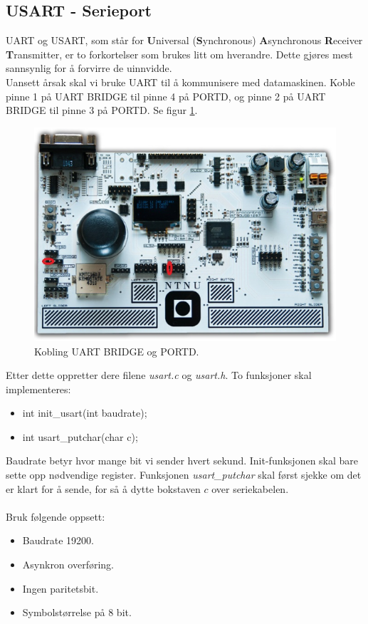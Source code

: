 \documentclass[11pt,a4paper]{article}
\begin{document}
\subsection{USART - Serieport}
\label{TASK::USART}
UART og USART, som står for \textbf{U}niversal (\textbf{S}ynchronous) \textbf{A}synchronous \textbf{R}eceiver \textbf{T}ransmitter, er to forkortelser som brukes litt om hverandre. Dette gjøres mest sannsynlig for å forvirre de uinnvidde.\\
Uansett årsak skal vi bruke UART til å kommunisere med datamaskinen. Koble pinne 1 på UART BRIDGE til pinne 4 på PORTD, og pinne 2 på UART BRIDGE til pinne 3 på PORTD. Se figur \ref{UART::PORTD}.
\begin{figure}[hb]
\centering
\includegraphics[width=0.8\linewidth]{uart_portd.png}
\caption{Kobling UART BRIDGE og PORTD.}
\label{UART::PORTD}
\end{figure}
Etter dette oppretter dere filene \textit{usart.c} og \textit{usart.h}. To funksjoner skal implementeres:
\begin{itemize}
\item int init\_usart(int baudrate);
\item int usart\_putchar(char c);
\end{itemize}
Baudrate betyr hvor mange bit vi sender hvert sekund. Init-funksjonen skal bare sette opp nødvendige register. Funksjonen \textit{usart\_putchar} skal først sjekke om det er klart for å sende, for så å dytte bokstaven $c$ over seriekabelen.\\
\\
Bruk følgende oppsett:
\begin{itemize}
\item Baudrate 19200.
\item Asynkron overføring.
\item Ingen paritetsbit.
\item Symbolstørrelse på 8 bit.
\end{itemize}
\end{document}
